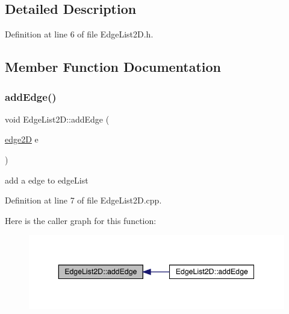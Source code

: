 \subsection{Detailed Description}


Definition at line 6 of file Edge\+List2\+D.\+h.



\subsection{Member Function Documentation}
\mbox{\label{class_edge_list2_d_a0887cfff4dfd1f5c0165750f69f0822a}} 
\subsubsection{\texorpdfstring{add\+Edge()}{addEdge()}\hspace{0.1cm}{\footnotesize\ttfamily [1/2]}}
{\footnotesize\ttfamily void Edge\+List2\+D\+::add\+Edge (\begin{DoxyParamCaption}\item[{\mbox{\hyperlink{structedge2_d}{edge2D}}}]{e }\end{DoxyParamCaption})}



add a edge to edge\+List 



Definition at line 7 of file Edge\+List2\+D.\+cpp.

Here is the caller graph for this function\+:
\nopagebreak
\begin{figure}[H]
\begin{center}
\leavevmode
\includegraphics[width=343pt]{class_edge_list2_d_a0887cfff4dfd1f5c0165750f69f0822a_icgraph}
\end{center}
\end{figure}
\mbox{\label{class_edge_list2_d_ad0085ac0f30c9135a8193bfef627e57f}} 
